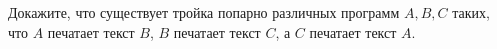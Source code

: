 Докажите, что существует тройка попарно различных программ $A, B, C$ таких, что $A$ печатает текст $B$,
$B$ печатает текст $C$, а $C$ печатает текст $A$.

